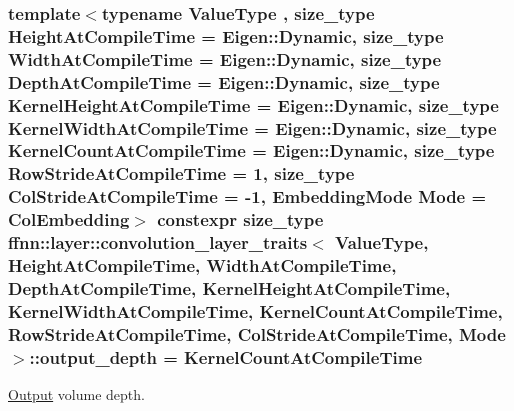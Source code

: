 \hypertarget{structffnn_1_1layer_1_1convolution__layer__traits_ad2c2cfab03dd0a071bf0497ecf514086}{
\subsubsection[{output\-\_\-depth}]{\setlength{\rightskip}{0pt plus 5cm}template$<$typename Value\-Type , size\-\_\-type Height\-At\-Compile\-Time = Eigen\-::\-Dynamic, size\-\_\-type Width\-At\-Compile\-Time = Eigen\-::\-Dynamic, size\-\_\-type Depth\-At\-Compile\-Time = Eigen\-::\-Dynamic, size\-\_\-type Kernel\-Height\-At\-Compile\-Time = Eigen\-::\-Dynamic, size\-\_\-type Kernel\-Width\-At\-Compile\-Time = Eigen\-::\-Dynamic, size\-\_\-type Kernel\-Count\-At\-Compile\-Time = Eigen\-::\-Dynamic, size\-\_\-type Row\-Stride\-At\-Compile\-Time = 1, size\-\_\-type Col\-Stride\-At\-Compile\-Time = -\/1, Embedding\-Mode Mode = Col\-Embedding$>$ constexpr {\bf size\-\_\-type} {\bf ffnn\-::layer\-::convolution\-\_\-layer\-\_\-traits}$<$ Value\-Type, Height\-At\-Compile\-Time, Width\-At\-Compile\-Time, Depth\-At\-Compile\-Time, Kernel\-Height\-At\-Compile\-Time, Kernel\-Width\-At\-Compile\-Time, Kernel\-Count\-At\-Compile\-Time, Row\-Stride\-At\-Compile\-Time, Col\-Stride\-At\-Compile\-Time, Mode $>$\-::output\-\_\-depth = Kernel\-Count\-At\-Compile\-Time\hspace{0.3cm}{\ttfamily [static]}}}\label{structffnn_1_1layer_1_1convolution__layer__traits_ad2c2cfab03dd0a071bf0497ecf514086}


\hyperlink{classffnn_1_1layer_1_1_output}{Output} volume depth. 

